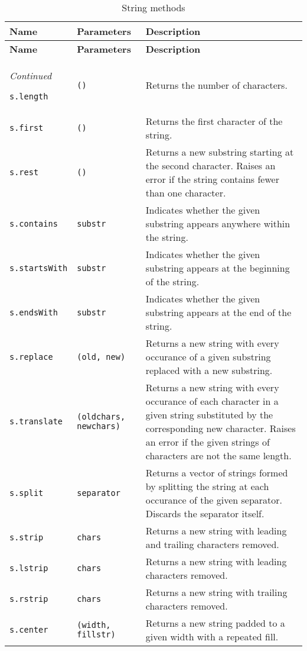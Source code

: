 \documentclass[11pt]{article}
\newcommand{\literal}[1]{\lstinline[style=DSL,identifierstyle=\itshape]!#1!}
\newcommand{\variable}[1]{\literal{#1}}
\begin{document}
\begin{longtable}[c]{l l|p{3.5in}}
  \caption{String methods} \\
  {\bfseries Name} & {\bfseries Parameters} & {\bfseries Description} \\ \hline
\endfirsthead
  {\bfseries Name} & {\bfseries Parameters} & {\bfseries Description} \\ \hline
\endhead
  \hline \emph{Continued}
\endfoot
  \hline
\endlastfoot

\variable{s.length} & \literal{()} & Returns the number of characters.\\
\variable{s.first} & \literal{()} & Returns the first character of the string.\\
\variable{s.rest} & \literal{()} & Returns a new substring starting at the second character. Raises an error if the string contains fewer than one character.\\
\variable{s.contains} & \literal{substr} & Indicates whether the given substring appears anywhere within the string.\\
\variable{s.startsWith} & \literal{substr} & Indicates whether the given substring appears at the beginning of the string.\\
\variable{s.endsWith} & \literal{substr} & Indicates whether the given substring appears at the end of the string.\\
\variable{s.replace} & \literal{(old, new)} & Returns a new string with every occurance of a given substring replaced with a new substring.\\
\variable{s.translate} & \literal{(oldchars, newchars)} & Returns a new string with every occurance of each character in a given string substituted by the corresponding new character. Raises an error if the given strings of characters are not the same length.\\
\variable{s.split} & \literal{separator} & Returns a vector of strings formed by splitting the string at each occurance of the given separator. Discards the separator itself.\\
\variable{s.strip} & \literal{chars} & Returns a new string with leading and trailing characters removed.\\
\variable{s.lstrip} & \literal{chars} & Returns a new string with leading characters removed.\\
\variable{s.rstrip} & \literal{chars} & Returns a new string with trailing characters removed.\\
\variable{s.center} & \literal{(width, fillstr)} & Returns a new string padded to a given width with a repeated fill.\\

\end{longtable}
\end{document}
